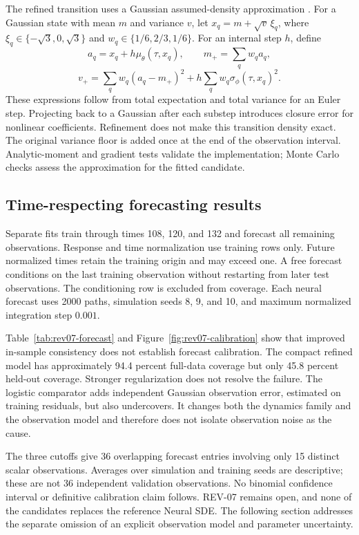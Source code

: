     The refined transition uses a Gaussian assumed-density approximation
    \citep{sarkka2019applied}. For a Gaussian state with mean \(m\) and variance
    \(v\), let \(x_q=m+\sqrt{v}\,\xi_q\), where
    \(\xi_q\in\{-\sqrt{3},0,\sqrt{3}\}\) and
    \(w_q\in\{1/6,2/3,1/6\}\). For an internal step \(h\), define
    \[
        a_q=x_q+h\mu_\theta(\tau,x_q),\qquad
        m_+=\sum_q w_q a_q,
    \]
    \[
        v_+=\sum_q w_q(a_q-m_+)^2
            +h\sum_q w_q\sigma_\phi(\tau,x_q)^2.
    \]
    These expressions follow from total expectation and total variance for an
    Euler step. Projecting back to a Gaussian after each substep introduces
    closure error for nonlinear coefficients. Refinement does not make this
    transition density exact. The original variance floor is added once at
    the end of the observation interval. Analytic-moment and gradient tests
    validate the implementation; Monte Carlo checks assess the approximation
    for the fitted candidate.

\subsection{Time-respecting forecasting results}

    Separate fits train through times 108, 120, and 132 and forecast all
    remaining observations. Response and time normalization use training rows
    only. Future normalized times retain the training origin and may exceed
    one. A free forecast conditions on the last training observation without
    restarting from later test observations. The conditioning row is excluded
    from coverage. Each neural forecast uses 2000 paths, simulation seeds 8,
    9, and 10, and maximum normalized integration step \(0.001\).

    Table~\ref{tab:rev07-forecast} and Figure~\ref{fig:rev07-calibration} show
    that improved in-sample consistency does not establish forecast calibration.
    The compact refined model has approximately 94.4 percent full-data coverage
    but only 45.8 percent held-out coverage. Stronger regularization does not
    resolve the failure. The logistic comparator adds independent Gaussian
    observation error, estimated on training residuals, but also undercovers.
    It changes both the dynamics family and the observation model and therefore
    does not isolate observation noise as the cause.

    The three cutoffs give 36 overlapping forecast entries involving only
    15 distinct scalar observations. Averages over simulation and training
    seeds are descriptive; these are not 36 independent validation observations.
    No binomial confidence interval or definitive calibration claim follows.
    REV-07 remains open, and none of the candidates replaces the reference
    Neural SDE. The following section addresses the separate omission of an
    explicit observation model and parameter uncertainty.

